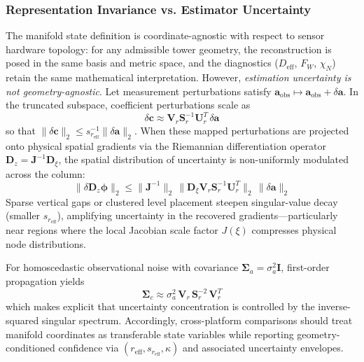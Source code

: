 \documentclass[11pt,a4paper]{article}
\begin{document}
\subsubsection{Representation Invariance vs. Estimator Uncertainty}
The manifold state definition is coordinate-agnostic with respect to sensor hardware topology: for any admissible tower geometry, the reconstruction is posed in the same basis and metric space, and the diagnostics ($D_{\mathrm{eff}}$, $F_W$, $\chi_N$) retain the same mathematical interpretation. However, \emph{estimation uncertainty is not geometry-agnostic}. Let measurement perturbations satisfy $\mathbf{a}_{\mathrm{obs}} \mapsto \mathbf{a}_{\mathrm{obs}} + \delta \mathbf{a}$. In the truncated subspace, coefficient perturbations scale as
\begin{equation}
\delta \mathbf{c} \approx \mathbf{V}_r \mathbf{S}_r^{-1} \mathbf{U}_r^T \, \delta \mathbf{a}
\label{eq:svd_uncertainty_map}
\end{equation}
so that $\|\delta \mathbf{c}\|_2 \le s_{r_{\mathrm{eff}}}^{-1}\|\delta \mathbf{a}\|_2$. When these mapped perturbations are projected onto physical spatial gradients via the Riemannian differentiation operator $\mathbf{D}_z = \mathbf{J}^{-1}\mathbf{D}_{\xi}$, the spatial distribution of uncertainty is non-uniformly modulated across the column:
\begin{equation}
\|\delta \mathbf{D}_z \mathbf{\phi}\|_2 \le \|\mathbf{J}^{-1}\|_2 \, \|\mathbf{D}_{\xi} \mathbf{V}_r \mathbf{S}_r^{-1} \mathbf{U}_r^T\|_2 \, \|\delta \mathbf{a}\|_2
\end{equation}
Sparse vertical gaps or clustered level placement steepen singular-value decay (smaller $s_{r_{\mathrm{eff}}}$), amplifying uncertainty in the recovered gradients---particularly near regions where the local Jacobian scale factor $J(\xi)$ compresses physical node distributions.

For homoscedastic observational noise with covariance $\mathbf{\Sigma}_a = \sigma_a^2\mathbf{I}$, first-order propagation yields
\begin{equation}
\mathbf{\Sigma}_c \approx \sigma_a^2\, \mathbf{V}_r\, \mathbf{S}_r^{-2}\, \mathbf{V}_r^T
\label{eq:svd_covariance}
\end{equation}
which makes explicit that uncertainty concentration is controlled by the inverse-squared singular spectrum. Accordingly, cross-platform comparisons should treat manifold coordinates as transferable state variables while reporting geometry-conditioned confidence via $(r_{\mathrm{eff}}, s_{r_{\mathrm{eff}}}, \kappa)$ and associated uncertainty envelopes.
\end{document}
